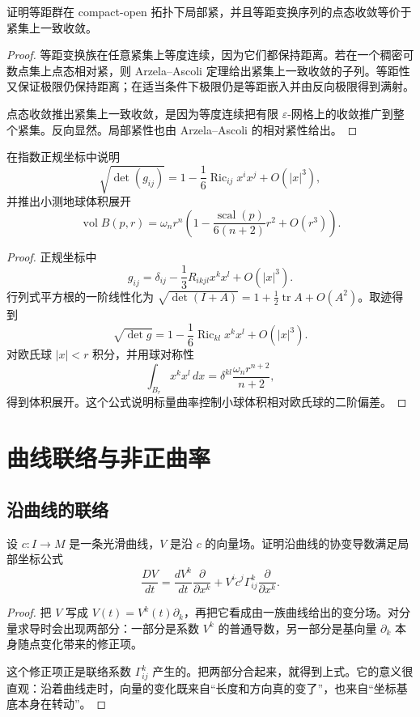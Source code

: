 \documentclass[11pt,a4paper,openany]{ctexbook}
\numberwithin{equation}{chapter}
\begin{document}
\begin{problem}
证明等距群在 compact-open 拓扑下局部紧，并且等距变换序列的点态收敛等价于紧集上一致收敛。
\end{problem}
\begin{proof}
等距变换族在任意紧集上等度连续，因为它们都保持距离。若在一个稠密可数点集上点态相对紧，则 Arzela--Ascoli 定理给出紧集上一致收敛的子列。等距性又保证极限仍保持距离；在适当条件下极限仍是等距嵌入并由反向极限得到满射。

点态收敛推出紧集上一致收敛，是因为等度连续把有限 \(\varepsilon\)-网格上的收敛推广到整个紧集。反向显然。局部紧性也由 Arzela--Ascoli 的相对紧性给出。
\end{proof}

\begin{problem}
在指数正规坐标中说明
\[
\sqrt{\det(g_{ij})}=1-\frac16\operatorname{Ric}_{ij}x^ix^j+O(|x|^3),
\]
并推出小测地球体积展开
\[
\operatorname{vol}B(p,r)=\omega_nr^n\left(1-\frac{\operatorname{scal}(p)}{6(n+2)}r^2+O(r^3)\right).
\]
\end{problem}
\begin{proof}
正规坐标中
\[
g_{ij}=\delta_{ij}-\frac13R_{ikjl}x^kx^l+O(|x|^3).
\]
行列式平方根的一阶线性化为 \(\sqrt{\det(I+A)}=1+\frac12\operatorname{tr}A+O(A^2)\)。取迹得到
\[
\sqrt{\det g}=1-\frac16\operatorname{Ric}_{kl}x^kx^l+O(|x|^3).
\]
对欧氏球 \(|x|<r\) 积分，并用球对称性
\[
\int_{B_r}x^kx^l\,dx=\delta^{kl}\frac{\omega_nr^{n+2}}{n+2},
\]
得到体积展开。这个公式说明标量曲率控制小球体积相对欧氏球的二阶偏差。
\end{proof}

\chapter{曲线联络与非正曲率}

\section{沿曲线的联络}

\begin{exercise}
设 \(c:I\to M\) 是一条光滑曲线，\(V\) 是沿 \(c\) 的向量场。证明沿曲线的协变导数满足局部坐标公式
\[
\frac{DV}{dt}=\frac{dV^k}{dt}\frac{\partial}{\partial x^k}+V^i\dot c^j\Gamma_{ij}^k\frac{\partial}{\partial x^k}.
\]
\end{exercise}
\begin{proof}
把 \(V\) 写成 \(V(t)=V^k(t)\partial_k\)，再把它看成由一族曲线给出的变分场。对分量求导时会出现两部分：一部分是系数 \(V^k\) 的普通导数，另一部分是基向量 \(\partial_k\) 本身随点变化带来的修正项。

这个修正项正是联络系数 \(\Gamma_{ij}^k\) 产生的。把两部分合起来，就得到上式。它的意义很直观：沿着曲线走时，向量的变化既来自“长度和方向真的变了”，也来自“坐标基底本身在转动”。
\end{proof}
\end{document}
